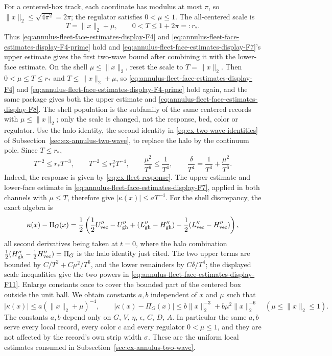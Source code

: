 For a centered-box track, each coordinate has modulus at most $\pi$,
so $\|x\|_2\leq\sqrt{4\pi^2}=2\pi$; the regulator satisfies
$0<\mu\leq1$. The
all-centered scale is
\begin{equation}
 T=\|x\|_2+\mu,
 \qquad 0<T\leq1+2\pi=:r_*.
 \label{eq:annulus-fleet-face-estimates-display-F10}
\end{equation}
Thus \eqref{eq:annulus-fleet-face-estimates-display-F4} and \eqref{eq:annulus-fleet-face-estimates-display-F4-prime} hold and \eqref{eq:annulus-fleet-face-estimates-display-F7}'s upper estimate gives the first
two-wave bound after combining it with the lower-face estimate. On the
shell $\mu\leq\|x\|_2$, reset the scale to
$T=\|x\|_2$. Then $0<\mu\leq T\leq r_*$ and $T\leq\|x\|_2+\mu$, so
\eqref{eq:annulus-fleet-face-estimates-display-F4} and \eqref{eq:annulus-fleet-face-estimates-display-F4-prime} hold again, and the same package gives
both the upper estimate and \eqref{eq:annulus-fleet-face-estimates-display-F8}. The shell population is the
subfamily of the same centered records with $\mu\leq\|x\|_2$; only the
scale is changed, not the response, bed, color or regulator. Use the
halo identity, the second identity in \eqref{eq:ex-two-wave-identities}
of Subsection~\ref{sec:ex-annulus-two-wave}, to replace the halo by the
continuum pole. Since $T\leq r_*$,
\[
 T^{-2}\leq r_*T^{-3},\qquad T^{-2}\leq r_*^2T^{-4},\qquad
 \frac{\mu^2}{T^6}\leq\frac1{T^4},\qquad
 \frac{\delta}{T^4}=\frac1{T^3}+\frac{\mu^2}{T^6}.
\]
Indeed, the response is given by \eqref{eq:ex-fleet-response}. The
upper estimate and lower-face estimate in \eqref{eq:annulus-fleet-face-estimates-display-F7}, applied in both
channels with $\mu\leq T$, therefore give $|\kappa(x)|\leq aT^{-4}$.
For the shell discrepancy, the exact algebra is
\begin{equation}
 \kappa(x)-\Pi_G(x)
 =\frac12\left(\frac12U_{\rm vec}''-U_{\rm gh}''
        +(L_{\rm gh}''-H_{\rm gh}'')
        -\frac12(L_{\rm vec}''-H_{\rm vec}'')\right),
 \label{eq:annulus-fleet-face-estimates-display-F12}
\end{equation}
all second derivatives being taken at $t=0$, where the halo
combination $\frac12(H_{\rm gh}''-\frac12H_{\rm vec}'')=\Pi_G$ is the
halo identity just cited. The two upper terms are bounded by
$C/T^2+C\mu^2/T^6$, and the lower remainders by $C\delta/T^4$;
the displayed scale inequalities give the two powers in \eqref{eq:annulus-fleet-face-estimates-display-F11}.
Enlarge constants once to cover the bounded part of the centered box
outside the unit ball. We obtain constants $a,b$ independent of $x$ and
$\mu$ such that
\begin{equation}
 |\kappa(x)|\leq a(\|x\|_2+\mu)^{-4},\qquad
 |\kappa(x)-\Pi_G(x)|\leq b\|x\|_2^{-3}
      +b\mu^2\|x\|_2^{-6}\quad(\mu\leq\|x\|_2\leq1).
 \label{eq:annulus-fleet-face-estimates-display-F11}
\end{equation}
The constants $a,b$ depend only on $G$, $V$, $\eta$, $\epsilon$, $C$,
$D$, $A$. In particular the same $a,b$ serve every local record, every
color $c$ and every regulator $0<\mu\leq1$, and they are not affected
by the record's own strip width $\sigma$.
These are the uniform local estimates consumed in
Subsection~\ref{sec:ex-annulus-two-wave}.

